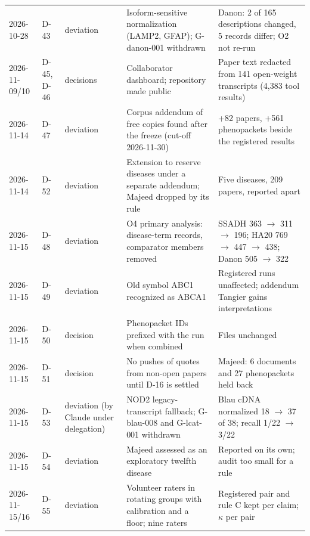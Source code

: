 \documentclass{article} %
\begin{document}
\begin{table}[!htbp]
\begin{center}
\begin{tabular}{L{1.5cm}L{0.7cm}L{1.4cm}L{4.1cm}L{3.8cm}}
2026-10-28 & D-43 & deviation & Isoform-sensitive normalization (LAMP2, GFAP); G-danon-001 withdrawn & Danon: 2 of 165 descriptions changed, 5 records differ; O2 not re-run \\
2026-11-09/10 & D-45, D-46 & decisions & Collaborator dashboard; repository made public & Paper text redacted from 141 open-weight transcripts (4,383 tool results) \\
2026-11-14 & D-47 & deviation & Corpus addendum of free copies found after the freeze (cut-off 2026-11-30) & +82 papers, +561 phenopackets beside the registered results \\
2026-11-14 & D-52 & deviation & Extension to reserve diseases under a separate addendum; Majeed dropped by its rule & Five diseases, 209 papers, reported apart \\
2026-11-15 & D-48 & deviation & O4 primary analysis: disease-term records, comparator members removed & SSADH 363 $\rightarrow$ 311 $\rightarrow$ 196; HA20 769 $\rightarrow$ 447 $\rightarrow$ 438; Danon 505 $\rightarrow$ 322 \\
2026-11-15 & D-49 & deviation & Old symbol ABC1 recognized as ABCA1 & Registered runs unaffected; addendum Tangier gains interpretations \\
2026-11-15 & D-50 & decision & Phenopacket IDs prefixed with the run when combined & Files unchanged \\
2026-11-15 & D-51 & decision & No pushes of quotes from non-open papers until D-16 is settled & Majeed: 6 documents and 27 phenopackets held back \\
2026-11-15 & D-53 & deviation (by Claude under delegation) & NOD2 legacy-transcript fallback; G-blau-008 and G-lcat-001 withdrawn & Blau cDNA normalized 18 $\rightarrow$ 37 of 38; recall 1/22 $\rightarrow$ 3/22 \\
2026-11-15 & D-54 & deviation & Majeed assessed as an exploratory twelfth disease & Reported on its own; audit too small for a rule \\
2026-11-15/16 & D-55 & deviation & Volunteer raters in rotating groups with calibration and a floor; nine raters & Registered pair and rule C kept per claim; $\kappa$ per pair \\
\bottomrule
\end{tabular}
\end{center}
\end{table}

\FloatBarrier
\end{document}
